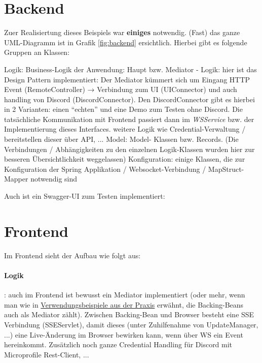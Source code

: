 \section{Backend}
Zuer Realisiertung dieses Beispiels war \textbf{einiges} notwendig. (Fast) das ganze UML-Diagramm ist in Grafik \ref{fig:backend} ersichtlich. Hierbei gibt es folgende Gruppen an Klassen:
\begin{outline}
    \1 Logik: Business-Logik der Anwendung:
        \2 Haupt bzw. Mediator - Logik: hier ist das Design Pattern implementiert: Der Mediator kümmert sich um Eingang HTTP Event (RemoteController) → Verbindung zum UI (UIConnector) und auch handling von Discord (DiscordConnector). Den DiscordConnector gibt es hierbei in 2 Varianten: einen \enquote{echten} und eine Demo zum Testen ohne Discord. Die tatsächliche Kommunikation mit Frontend passiert dann im \textit{WSService} bzw. der Implementierung dieses Interfaces.
        \2 weitere Logik wie Credential-Verwaltung / bereitstellen dieser über API, ...
    \1 Model: Model- Klassen bzw. Records. (Die Verbindungen / Abhängigkeiten zu den einzelnen Logik-Klassen wurden hier zur besseren Übersichtlichkeit weggelassen)
    \1 Konfiguration: einige Klassen, die zur Konfiguration der Spring Applikation / Websocket-Verbindung / MapStruct-Mapper notwendig sind
\end{outline}
\newpage
Auch ist ein Swagger-UI zum Testen implementiert:
\newpage
% 
% 
\section{Frontend}
Im Frontend sieht der Aufbau wie folgt aus: 
\paragraph{Logik}:
auch im Frontend ist bewusst ein Mediator implementiert (oder mehr, wenn man wie in \hyperref[ref:VerwendungPraxis]{Verwendungsbeispiele aus der Praxis} erwähnt, die Backing-Beans auch als Mediator zählt). Zwischen Backing-Bean und Browser besteht eine \gls{SSE} Verbindung (SSEServlet), damit dieses (unter Zuhilfenahme von UpdateManager, ...) eine Live-Änderung im Browser bewirken kann, wenn über \gls{WS} ein Event hereinkommt. Zusätzlich noch ganze Credential Handling für Discord mit Microprofile Rest-Client, ...
\filbreak
